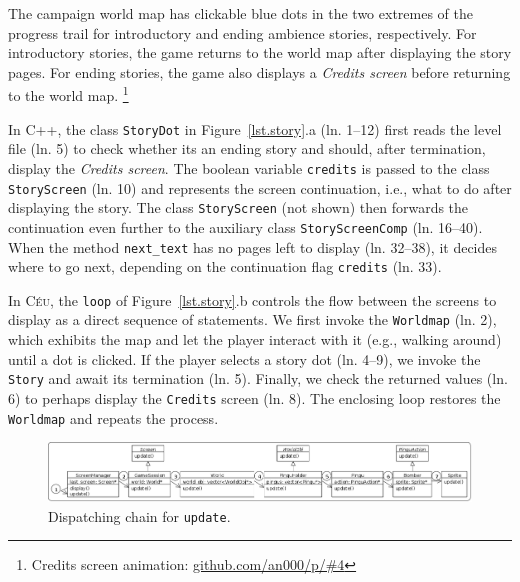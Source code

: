 \documentclass{vgtc}                          %
\newcommand{\CEU}{\textsc{C\'{e}u}\xspace}
\newcommand{\code}[1] {{\small{\texttt{#1}}}}
\begin{document}
The campaign world map has clickable blue dots in the two extremes of the
progress trail for introductory and ending ambience stories, respectively.
For introductory stories, the game returns to the world map after displaying 
the story pages.
For ending stories, the game also displays a \emph{Credits screen} before
returning to the world map.%
\footnote{Credits screen animation: \url{github.com/an000/p/#4} }

In C++, the class \code{StoryDot} in Figure~\ref{lst.story}.a (ln. 1--12) first
reads the level file (ln. 5) to check whether its an ending story and should,
after termination, display the \emph{Credits screen}.
%
The boolean variable \code{credits} is passed to the class
\code{StoryScreen} (ln. 10) and represents the screen continuation, i.e., what
to do after displaying the story.
The class \code{StoryScreen} (not shown) then forwards the continuation even
further to the auxiliary class \code{StoryScreenComp} (ln. 16--40).
%
When the method \code{next\_text} has no pages left to display (ln. 32--38),
it decides where to go next, depending on the continuation flag
\code{credits} (ln. 33).

In \CEU, the \code{loop} of Figure~\ref{lst.story}.b controls the flow between
the screens to display as a direct sequence of statements.
%
We first invoke the \code{Worldmap} (ln. 2), which exhibits the map and let
the player interact with it (e.g., walking around) until a dot is clicked.
If the player selects a story dot (ln. 4--9), we invoke the \code{Story}
and await its termination (ln. 5).
Finally, we check the returned values (ln. 6) to perhaps display the
\code{Credits} screen (ln. 8).
The enclosing loop restores the \code{Worldmap} and repeats the process.

\begin{figure}[t]
\centering
\includegraphics[width=\textwidth]{hierarchy}
\caption{Dispatching chain for \code{update}.
\label{fig.hier}
}
\end{figure}
\end{document}
